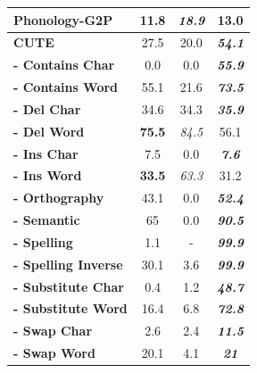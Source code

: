 \documentclass[]{fairmeta}
\begin{document}
\begin{table}[t]
\begin{tabular}{@{}lccc@{}}
\midrule
\textbf{Phonology-G2P} & 
11.8 & \emph{18.9} & \textbf{13.0} \\
\midrule
\textbf{CUTE} & 
27.5 & 20.0 & \emph{\textbf{54.1}} \\
        \hspace{0.5cm}\textbf{- Contains Char}    & 0.0	          & 0.0 & \emph{\textbf{55.9}} \\
        \hspace{0.5cm}\textbf{- Contains Word}    & 55.1	      & 21.6 & \emph{\textbf{73.5}} \\
        \hspace{0.5cm}\textbf{- Del Char}         & 34.6	      & 34.3 & \emph{\textbf{35.9}} \\
        \hspace{0.5cm}\textbf{- Del Word}         & \textbf{75.5} &	\emph{84.5} & 56.1 \\
        \hspace{0.5cm}\textbf{- Ins Char}         & 7.5	          & 0.0 & \emph{\textbf{7.6}} \\
        \hspace{0.5cm}\textbf{- Ins Word}         & \textbf{33.5} & \emph{63.3}	& 31.2 \\
        \hspace{0.5cm}\textbf{- Orthography}      & 43.1	      & 0.0 & \emph{\textbf{52.4}} \\
        \hspace{0.5cm}\textbf{- Semantic}         & 65	          & 0.0 & \emph{\textbf{90.5}} \\
        \hspace{0.5cm}\textbf{- Spelling}         & 1.1	          & - & \emph{\textbf{99.9}} \\
        \hspace{0.5cm}\textbf{- Spelling Inverse} & 30.1	      & 3.6 & \emph{\textbf{99.9}} \\
        \hspace{0.5cm}\textbf{- Substitute Char}  & 0.4	          & 1.2 & \emph{\textbf{48.7}} \\
        \hspace{0.5cm}\textbf{- Substitute Word}  & 16.4	      & 6.8 & \emph{\textbf{72.8}} \\
        \hspace{0.5cm}\textbf{- Swap Char}        & 2.6	          & 2.4 & \emph{\textbf{11.5}} \\
        \hspace{0.5cm}\textbf{- Swap Word}        & 20.1	      & 4.1 & \emph{\textbf{21}} \\


\end{tabular}
\end{table}
\end{document}
